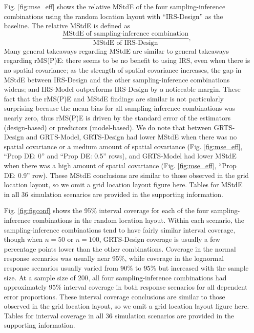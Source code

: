 \documentclass[]{elsarticle} %
\begin{document}
Fig. \ref{fig:mse_eff} shows the relative MStdE of the four
sampling-inference combinations using the random location layout with
``IRS-Design'' as the baseline. The relative MStdE is defined as
\begin{equation*}
\frac{\text{MStdE of sampling-inference combination}}{\text{MStdE of IRS-Design}},
\end{equation*} Many general takeaways regarding MStdE are similar to
general takeaways regarding rMS(P)E: there seems to be no benefit to
using IRS, even when there is no spatial covariance; as the strength of
spatial covariance increases, the gap in MStdE between IRS-Design and
the other sampling-inference combinations widens; and IRS-Model
outperforms IRS-Design by a noticeable margin. These fact that the
rMS(P)E and MStdE findings are similar is not particularly surprising
because the mean bias for all sampling-inference combinations was nearly
zero, thus rMS(P)E is driven by the standard error of the estimators
(design-based) or predictors (model-based). We do note that between
GRTS-Design and GRTS-Model, GRTS-Design had lower MStdE when there was
no spatial covariance or a medium amount of spatial covariance (Fig.
\ref{fig:mse_eff}, ``Prop DE: 0'' and ``Prop DE: 0.5'' rows), and
GRTS-Model had lower MStdE when there was a high amount of spatial
covariance (Fig. \ref{fig:mse_eff}, ``Prop DE: 0.9'' row). These MStdE
conclusions are similar to those observed in the grid location layout,
so we omit a grid location layout figure here. Tables for MStdE in all
36 simulation scenarios are provided in the supporting information.

Fig. \ref{fig:figconf} shows the 95\% interval coverage for each of the
four sampling-inference combinations in the random location layout.
Within each scenario, the sampling-inference combinations tend to have
fairly similar interval coverage, though when \(n = 50\) or \(n = 100\),
GRTS-Design coverage is usually a few percentage points lower than the
other combinations. Coverage in the normal response scenarios was
usually near 95\%, while coverage in the lognormal response scenarios
usually varied from 90\% to 95\% but increased with the sample size. At
a sample size of 200, all four sampling-inference combinations had
approximately 95\% interval coverage in both response scenarios for all
dependent error proportions. These interval coverage conclusions are
similar to those observed in the grid location layout, so we omit a grid
location layout figure here. Tables for interval coverage in all 36
simulation scenarios are provided in the supporting information.
\end{document}
